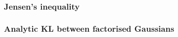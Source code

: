 \documentclass[11pt]{article}
\begin{document}
\subsubsection{Jensen's inequality}\label{sect:Jensen's inequality}

\begin{figure}[H]
    \centering
\end{figure}

\subsubsection{Analytic KL between factorised Gaussians}\label{sect:Analytic KL between factorised Gaussians}
\end{document}
